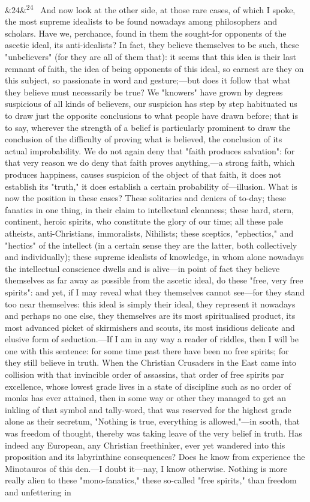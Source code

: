 \documentclass[12pt]{article}
\newcommand{\para}[1][]{\par\noindent\ifx&#1&\else\textsuperscript{\footnotesize #1}~\fi}
\begin{document}
\para[24] And now look at the other side, at those rare cases, of which I spoke, the most supreme idealists to be found nowadays among philosophers and scholars. Have we, perchance, found in them the sought-for opponents of the ascetic ideal, its anti-idealists? In fact, they believe themselves to be such, these "unbelievers" (for they are all of them that): it seems that this idea is their last remnant of faith, the idea of being opponents of this ideal, so earnest are they on this subject, so passionate in word and gesture;---but does it follow that what they believe must necessarily be true? We "knowers" have grown by degrees suspicious of all kinds of believers, our suspicion has step by step habituated us to draw just the opposite conclusions to what people have drawn before; that is to say, wherever the strength of a belief is particularly prominent to draw the conclusion of the difficulty of proving what is believed, the conclusion of its actual improbability. We do not again deny that "faith produces salvation": for that very reason we do deny that faith proves anything,---a strong faith, which produces happiness, causes suspicion of the object of that faith, it does not establish its "truth," it does establish a certain probability of---illusion. What is now the position in these cases? These solitaries and deniers of to-day; these fanatics in one thing, in their claim to intellectual cleanness; these hard, stern, continent, heroic spirits, who constitute the glory of our time; all these pale atheists, anti-Christians, immoralists, Nihilists; these sceptics, "ephectics," and "hectics" of the intellect (in a certain sense they are the latter, both collectively and individually); these supreme idealists of knowledge, in whom alone nowadays the intellectual conscience dwells and is alive---in point of fact they believe themselves as far away as possible from the ascetic ideal, do these "free, very free spirits": and yet, if I may reveal what they themselves cannot see---for they stand too near themselves: this ideal is simply their ideal, they represent it nowadays and perhaps no one else, they themselves are its most spiritualised product, its most advanced picket of skirmishers and scouts, its most insidious delicate and elusive form of seduction.---If I am in any way a reader of riddles, then I will be one with this sentence: for some time past there have been no free spirits; for they still believe in truth. When the Christian Crusaders in the East came into collision with that invincible order of assassins, that order of free spirits par excellence, whose lowest grade lives in a state of discipline such as no order of monks has ever attained, then in some way or other they managed to get an inkling of that symbol and tally-word, that was reserved for the highest grade alone as their secretum, "Nothing is true, everything is allowed,"---in sooth, that was freedom of thought, thereby was taking leave of the very belief in truth. Has indeed any European, any Christian freethinker, ever yet wandered into this proposition and its labyrinthine consequences? Does he know from experience the Minotauros of this den.---I doubt it---nay, I know otherwise. Nothing is more really alien to these "mono-fanatics," these so-called "free spirits," than freedom and unfettering in 
\end{document}
